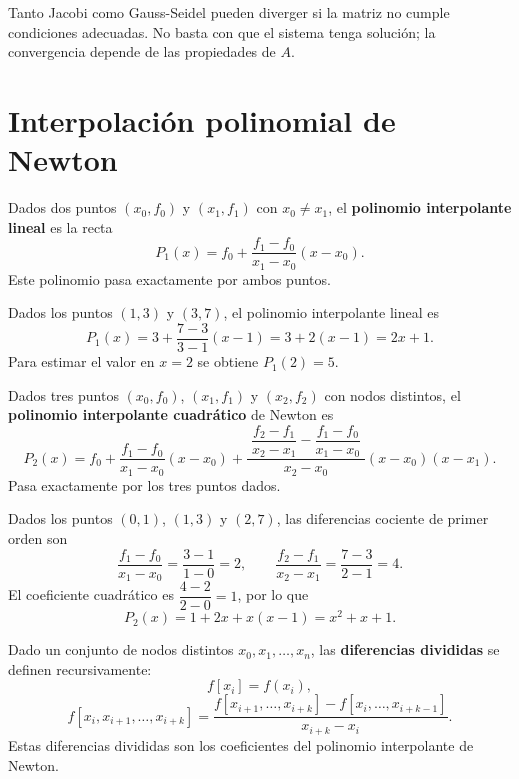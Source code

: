 \documentclass[a4,11pt]{aleph-notas}
\begin{document}
\begin{advertencia}
    Tanto Jacobi como Gauss-Seidel pueden diverger si la matriz no cumple condiciones adecuadas. No basta con que el sistema tenga solución; la convergencia depende de las propiedades de $A$.
\end{advertencia}


\section{Interpolación polinomial de Newton}

\begin{defi}
    Dados dos puntos $(x_0,f_0)$ y $(x_1,f_1)$ con $x_0\neq x_1$, el \textbf{polinomio interpolante lineal} es la recta
    \[
        P_1(x)=f_0+\frac{f_1-f_0}{x_1-x_0}(x-x_0).
    \]
    Este polinomio pasa exactamente por ambos puntos.
\end{defi}

\begin{ejem}
    Dados los puntos $(1,3)$ y $(3,7)$, el polinomio interpolante lineal es
    \[
        P_1(x)=3+\frac{7-3}{3-1}(x-1)=3+2(x-1)=2x+1.
    \]
    Para estimar el valor en $x=2$ se obtiene $P_1(2)=5$.
\end{ejem}

\begin{defi}
    Dados tres puntos $(x_0,f_0)$, $(x_1,f_1)$ y $(x_2,f_2)$ con nodos distintos, el \textbf{polinomio interpolante cuadrático} de Newton es
    \[
        P_2(x)
        =
        f_0
        +
        \frac{f_1-f_0}{x_1-x_0}(x-x_0)
        +
        \frac{\;\dfrac{f_2-f_1}{x_2-x_1}-\dfrac{f_1-f_0}{x_1-x_0}\;}{x_2-x_0}
        (x-x_0)(x-x_1).
    \]
    Pasa exactamente por los tres puntos dados.
\end{defi}

\begin{ejem}
    Dados los puntos $(0,1)$, $(1,3)$ y $(2,7)$, las diferencias cociente de primer orden son
    \[
        \frac{f_1-f_0}{x_1-x_0}=\frac{3-1}{1-0}=2,\qquad
        \frac{f_2-f_1}{x_2-x_1}=\frac{7-3}{2-1}=4.
    \]
    El coeficiente cuadrático es $\dfrac{4-2}{2-0}=1$, por lo que
    \[
        P_2(x)=1+2x+x(x-1)=x^2+x+1.
    \]
\end{ejem}

\begin{defi}
    Dado un conjunto de nodos distintos $x_0,x_1,\ldots,x_n$, las \textbf{diferencias divididas} se definen recursivamente:
    \[
        f[x_i]=f(x_i),
    \]
    \[
        f[x_i,x_{i+1},\ldots,x_{i+k}]
        =
        \frac{f[x_{i+1},\ldots,x_{i+k}]-f[x_i,\ldots,x_{i+k-1}]}{x_{i+k}-x_i}.
    \]
    Estas diferencias divididas son los coeficientes del polinomio interpolante de Newton.
\end{defi}
\end{document}
